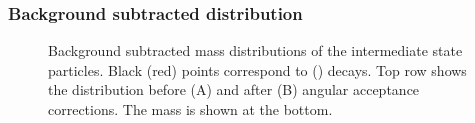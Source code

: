 \subsubsection{Background subtracted \mkpi distribution}

\begin{figure}[!t]
  \centering
  \begin{subfigure}{0.5\textwidth}
    \raggedright
    \scalebox{0.56}{}
    \caption{}
    \label{mkpiPlot_raw}
  \end{subfigure}%
  \hfill%
  \begin{subfigure}{0.5\textwidth}
    \raggedleft
    \scalebox{0.56}{}
    \caption{}
    \label{mkpiPlot_eff}
  \end{subfigure}
  \begin{subfigure}{0.5\textwidth}
    \raggedright
    \scalebox{0.56}{}
    \caption{}
    \label{jpsiPlot}
  \end{subfigure}
\caption{Background subtracted mass distributions of the intermediate state particles.
         Black (red) points correspond to \Bd (\Bs) decays. Top row shows the \mkpi distribution before (A)
         and after (B) angular acceptance corrections. The \jpsi mass is shown at the bottom.}
\end{figure}

